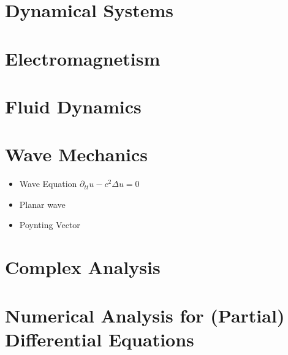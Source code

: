 \documentclass[10pt]{article}
\begin{document}
\section{Dynamical Systems}

\section{Electromagnetism}

\section{Fluid Dynamics}

\section{Wave Mechanics}
\begin{itemize}
	\item Wave Equation $\partial_{tt} u-c^2\Delta u=0$
	\item Planar wave
	\item Poynting Vector
\end{itemize}

\section{Complex Analysis}

\section{Numerical Analysis for (Partial) Differential Equations}
\end{document}
